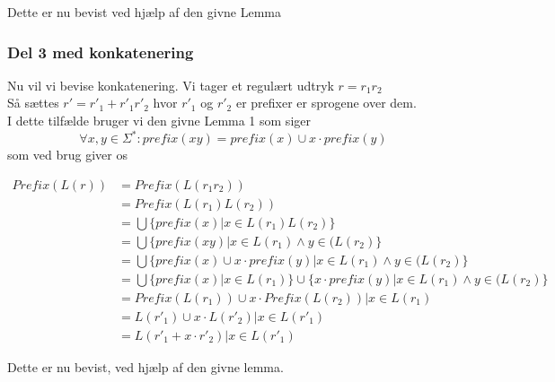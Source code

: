 \documentclass{article}
\begin{document}
    Dette er nu bevist ved hjælp af den givne Lemma

\subsubsection*{Del 3 med konkatenering}
    Nu vil vi bevise konkatenering.
    Vi tager et regulært udtryk $r = r_1r_2$\\
    Så sættes $r' = r'_1 + r'_1r'_2$ hvor $r'_1$ og $r'_2$ er prefixer er sprogene over dem.\\
    I dette tilfælde bruger vi den givne Lemma 1 som siger $$ \forall x,y\in\Sigma^*: prefix(xy) = prefix(x) \cup x\cdot prefix(y)$$
    som ved brug giver os
    
    \begin{equation*}
        \begin{split}
        Prefix(L(r)) &= Prefix(L(r_1r_2)) \\
            &= Prefix(L(r_1)L(r_2)) \\
            &= \bigcup \{prefix(x) | x \in L(r_1)L(r_2)\} \\
            &= \bigcup \{prefix(xy) | x \in L(r_1) \wedge y \in (L(r_2)\} \\
            &= \bigcup \{prefix(x) \cup x \cdot prefix(y) | x \in L(r_1) \wedge y \in (L(r_2)\} \\
            &= \bigcup \{prefix(x) | x \in L(r_1) \} \cup \{x \cdot prefix(y) | x \in L(r_1) \wedge y \in (L(r_2)\} \\
            &= Prefix(L(r_1)) \cup x \cdot Prefix(L(r_2)) | x \in L(r_1) \\
            &= L(r'_1) \cup x \cdot L(r'_2) | x \in L(r'_1) \\
            &= L(r'_1 + x \cdot r'_2) | x \in L(r'_1) 
        \end{split}
    \end{equation*}
    
    Dette er nu bevist, ved hjælp af den givne lemma.
\end{document}
